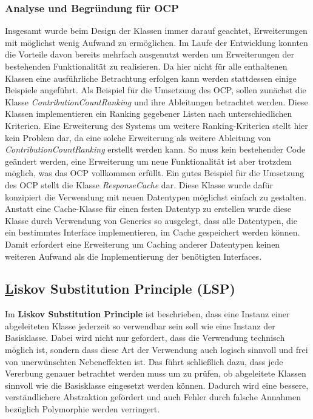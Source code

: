 \subsubsection{Analyse und Begründung für OCP}
Insgesamt wurde beim Design der Klassen immer darauf geachtet, Erweiterungen mit möglichst wenig Aufwand zu ermöglichen.
Im Laufe der Entwicklung konnten die Vorteile davon bereits mehrfach ausgenutzt werden um Erweiterungen der bestehenden Funktionalität zu realisieren.
Da hier nicht für alle enthaltenen Klassen eine ausführliche Betrachtung erfolgen kann werden stattdessen einige Beispiele angeführt.
\label{sec:OCP_Strategy}
Als Beispiel für die Umsetzung des OCP, sollen zunächst die Klasse \textit{ContributionCountRanking} und ihre Ableitungen betrachtet werden.
Diese Klassen implementieren ein Ranking gegebener Listen nach unterschiedlichen Kriterien.
Eine Erweiterung des Systems um weitere Ranking-Kriterien stellt hier kein Problem dar, da eine solche Erweiterung als weitere Ableitung von \textit{ContributionCountRanking} erstellt werden kann.
So muss kein bestehender Code geändert werden, eine Erweiterung um neue Funktionalität ist aber trotzdem möglich, was das OCP vollkommen erfüllt.
\newline
Ein gutes Beispiel für die Umsetzung des OCP stellt die Klasse \textit{ResponseCache} dar. 
Diese Klasse wurde dafür konzipiert die Verwendung mit neuen Datentypen möglichst einfach zu gestalten.
Anstatt eine Cache-Klasse für einen festen Datentyp zu erstellen wurde diese Klasse durch Verwendung von Generics so ausgelegt, dass alle Datentypen, die ein bestimmtes Interface implementieren, im Cache gespeichert werden können.
Damit erfordert eine Erweiterung um Caching anderer Datentypen keinen weiteren Aufwand als die Implementierung der benötigten Interfaces.



\newpage
\subsection{\underline{L}iskov Substitution Principle (LSP)}
\label{sec:LSP}

Im \textbf{Liskov Substitution Principle} ist beschrieben, dass eine Instanz einer abgeleiteten Klasse jederzeit so verwendbar sein soll wie eine Instanz der Basisklasse.
Dabei wird nicht nur gefordert, dass die Verwendung technisch möglich ist, sondern dass diese Art der Verwendung auch logisch sinnvoll und frei von unerwünschten Nebeneffekten ist.
Das führt schließlich dazu, dass jede Vererbung genauer betrachtet werden muss um zu prüfen, ob abgeleitete Klassen sinnvoll wie die Basisklasse eingesetzt werden können.
Dadurch wird eine bessere, verständlichere Abstraktion gefördert und auch Fehler durch falsche Annahmen bezüglich Polymorphie werden verringert.

